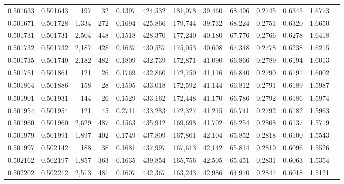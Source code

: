 \begin{tabular}{rrrrrrrrrrrrr}
0.501633 & 0.501643 &   197 &    32 &                                     0.1397 & 424,532 & 181,078 &  39,460 &  68,496 & 0.2745 & 0.6345 & 1.6773 \\
0.501671 & 0.501728 & 1,334 &   272 &                                     0.1694 & 425,866 & 179,744 &  39,732 &  68,224 & 0.2751 & 0.6320 & 1.6650 \\
0.501731 & 0.501731 & 2,504 &   448 &                                     0.1518 & 428,370 & 177,240 &  40,180 &  67,776 & 0.2766 & 0.6278 & 1.6418 \\
0.501732 & 0.501732 & 2,187 &   428 &                                     0.1637 & 430,557 & 175,053 &  40,608 &  67,348 & 0.2778 & 0.6238 & 1.6215 \\
0.501735 & 0.501749 & 2,182 &   482 &                                     0.1809 & 432,739 & 172,871 &  41,090 &  66,866 & 0.2789 & 0.6194 & 1.6013 \\
0.501751 & 0.501861 &   121 &    26 &                                     0.1769 & 432,860 & 172,750 &  41,116 &  66,840 & 0.2790 & 0.6191 & 1.6002 \\
0.501864 & 0.501886 &   158 &    28 &                                     0.1505 & 433,018 & 172,592 &  41,144 &  66,812 & 0.2791 & 0.6189 & 1.5987 \\
0.501901 & 0.501931 &   144 &    26 &                                     0.1529 & 433,162 & 172,448 &  41,170 &  66,786 & 0.2792 & 0.6186 & 1.5974 \\
0.501954 & 0.501954 &   121 &    45 &                                     0.2711 & 433,283 & 172,327 &  41,215 &  66,741 & 0.2792 & 0.6182 & 1.5963 \\
0.501960 & 0.501960 & 2,629 &   487 &                                     0.1563 & 435,912 & 169,698 &  41,702 &  66,254 & 0.2808 & 0.6137 & 1.5719 \\
0.501979 & 0.501991 & 1,897 &   402 &                                     0.1749 & 437,809 & 167,801 &  42,104 &  65,852 & 0.2818 & 0.6100 & 1.5543 \\
0.501997 & 0.502142 &   188 &    38 &                                     0.1681 & 437,997 & 167,613 &  42,142 &  65,814 & 0.2819 & 0.6096 & 1.5526 \\
0.502162 & 0.502197 & 1,857 &   363 &                                     0.1635 & 439,854 & 165,756 &  42,505 &  65,451 & 0.2831 & 0.6063 & 1.5354 \\
0.502202 & 0.502212 & 2,513 &   481 &                                     0.1607 & 442,367 & 163,243 &  42,986 &  64,970 & 0.2847 & 0.6018 & 1.5121 \\

\end{tabular}
